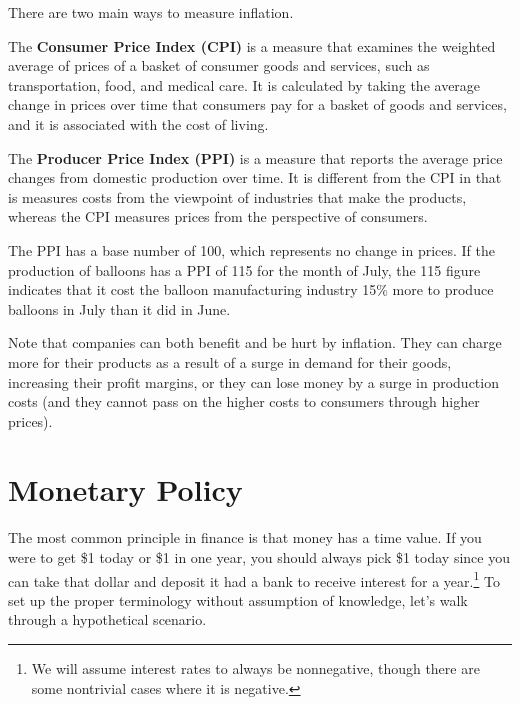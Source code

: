 \documentclass{article}
\begin{document}
  There are two main ways to measure inflation. 

  \begin{definition}
    \label{def:consumer-price-index}
    The \textbf{Consumer Price Index (CPI)} is a measure that examines the weighted average of prices of a basket of consumer goods and services, such as transportation, food, and medical care. It is calculated by taking the average change in prices over time that consumers pay for a basket of goods and services, and it is associated with the cost of living. 
  \end{definition}

  \begin{definition}
    \label{def:producer-price-index}
    The \textbf{Producer Price Index (PPI)} is a measure that reports the average price changes from domestic production over time. It is different from the CPI in that is measures costs from the viewpoint of industries that make the products, whereas the CPI measures prices from the perspective of consumers. 
  \end{definition}

  \begin{example}
    \label{ex:ppi-of-balloons}
    The PPI has a base number of 100, which represents no change in prices. If the production of balloons has a PPI of 115 for the month of July, the 115 figure indicates that it cost the balloon manufacturing industry 15\% more to produce balloons in July than it did in June. 
  \end{example}

  Note that companies can both benefit and be hurt by inflation. They can charge more for their products as a result of a surge in demand for their goods, increasing their profit margins, or they can lose money by a surge in production costs (and they cannot pass on the higher costs to consumers through higher prices). 

\section{Monetary Policy}

    The most common principle in finance is that money has a time value. If you were to get \$1 today or \$1 in one year, you should always pick \$1 today since you can take that dollar and deposit it had a bank to receive interest for a year.\footnote{We will assume interest rates to always be nonnegative, though there are some nontrivial cases where it is negative.} To set up the proper terminology without assumption of knowledge, let's walk through a hypothetical scenario. 
\end{document}
